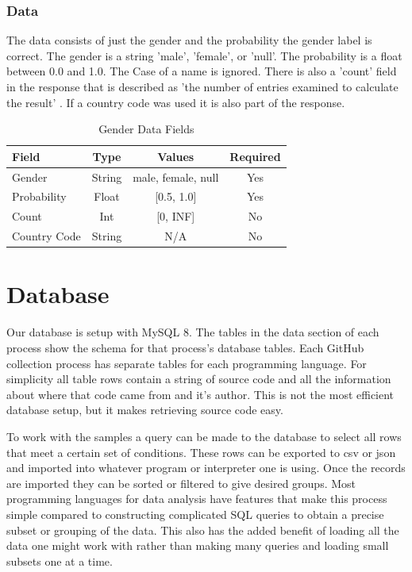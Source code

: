 \documentclass[12pt]{article}
\begin{document}
\subsubsection*{Data}
The data consists of just the gender and the probability the gender label is correct. The gender is a string 'male', 'female', or 'null'. The probability is a float between 0.0 and 1.0. The Case of a name is ignored. There is also a 'count' field in the response that is described as 'the number of entries examined to calculate the result' \cite{WEBSITE:GENDER1}. If a country code was used it is also part of the response.

\begin{table}[t]
    \begin{center}
        \caption{Gender Data Fields}
        \label{tab:gen_data}
        \begin{tabular}{| l |c | c | c |}
            \hline
            \textbf{Field} & \textbf{Type} & \textbf{Values} & \textbf{Required}\\
            \hline
            Gender & String & {male, female, null} & Yes\\
            Probability & Float & [0.5, 1.0] & Yes\\ 
            Count & Int & [0, INF] & No\\
            Country Code & String & N/A & No\\
            \hline
        \end{tabular}
    \end{center}
\end{table}


\section{Database}
Our database is setup with MySQL 8. The tables in the data section of each process show the schema for that process's database tables. Each GitHub collection process has separate tables for each programming language. For simplicity all table rows contain a string of source code and all the information about where that code came from and it's author. This is not the most efficient database setup, but it makes retrieving source code easy.

To work with the samples a query can be made to the database to select all rows that meet a certain set of conditions. These rows can be exported to csv or json and imported into whatever program or interpreter one is using. Once the records are imported they can be sorted or filtered to give desired groups. Most programming languages for data analysis have features that make this process simple compared to constructing complicated SQL queries to obtain a precise subset or grouping of the data. This also has the added benefit of loading all the data one might work with rather than making many queries and loading small subsets one at a time.
\end{document}
